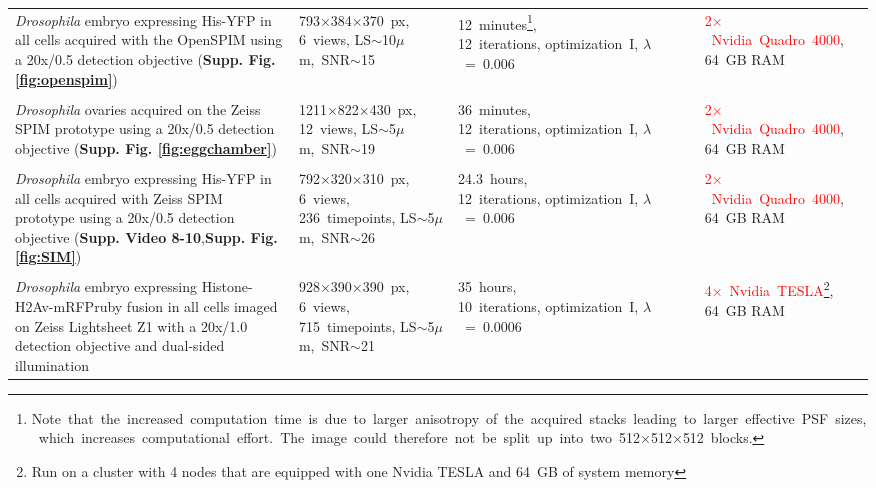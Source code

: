 \documentclass[]{spie}  %
\begin{document}
\begin{savenotes}
\begin{table}[h!]
{\begin{tabular}{p{5.5cm}p{3.0cm}p{3.6cm}p{3.5cm}}
\emph{Drosophila} embryo expressing His-YFP in all cells acquired with the OpenSPIM using a 20x/0.5 detection objective (\textbf{Supp. Fig. \ref{fig:openspim}}) & \mbox{793$\times$384$\times$370~px}, \mbox{6~views}, \mbox{LS$\sim$10$\mu$m, SNR$\sim$15} & \mbox{12 minutes\footnote{Note that the increased computation time is due to larger anisotropy of the acquired stacks leading to larger effective PSF sizes, which increases  computational effort. The image could therefore not be split up into two \mbox{512$\times$512$\times$512} blocks.},~~~~~~~~~~~~~~~~} \mbox{12 iterations}, \mbox{optimization I}, $\lambda$~=~0.006 & \mbox{\textcolor{red}{2$\times$~Nvidia~Quadro~4000}}\setcounter{restorecntr2}{\value{footnote}}\setcounter{footnote}{\value{savecntr2}}\footnotemark \setcounter{footnote}{\value{restorecntr2}}, 64~GB RAM\\
\\
\emph{Drosophila} ovaries acquired on the Zeiss SPIM prototype using a 20x/0.5 detection objective (\textbf{Supp. Fig. \ref{fig:eggchamber}}) & \mbox{1211$\times$822$\times$430~px}, \mbox{12 views}, \mbox{LS$\sim$5$\mu$m, SNR$\sim$19} & \mbox{36 minutes,~~~~~~~~~~~~~~~~} \mbox{12 iterations}, \mbox{optimization I}, $\lambda$~=~0.006  & \mbox{\textcolor{red}{2$\times$~Nvidia~Quadro~4000}}\setcounter{restorecntr2}{\value{footnote}}\setcounter{footnote}{\value{savecntr2}}\footnotemark \setcounter{footnote}{\value{restorecntr2}}, 64~GB RAM \\
\\
\emph{Drosophila} embryo expressing His-YFP in all cells acquired with Zeiss SPIM prototype using a 20x/0.5 detection objective (\textbf{Supp. Video 8-10},\textbf{Supp. Fig. \ref{fig:SIM}}) & \mbox{792$\times$320$\times$310~px}, \mbox{6~views}, \mbox{236 timepoints}, \mbox{LS$\sim$5$\mu$m, SNR$\sim$26} & \mbox{24.3 hours,~~~~~~~~~~~~~~~~} \mbox{12 iterations}, \mbox{optimization I}, $\lambda$~=~0.006 & \mbox{\textcolor{red}{2$\times$~Nvidia~Quadro~4000}}\setcounter{restorecntr2}{\value{footnote}}\setcounter{footnote}{\value{savecntr2}}\footnotemark \setcounter{footnote}{\value{restorecntr2}}, 64~GB RAM\\
\\
\emph{Drosophila} embryo expressing Histone-H2Av-mRFPruby fusion in all cells imaged on Zeiss Lightsheet Z1 with a 20x/1.0 detection objective and dual-sided illumination & \mbox{928$\times$390$\times$390~px}, \mbox{6~views}, \mbox{715~timepoints}, \mbox{LS$\sim$5$\mu$m, SNR$\sim$21} & \mbox{35 hours,~~~~~~~~~~~~~~~~} \mbox{10 iterations}, \mbox{optimization I}, $\lambda$~=~0.0006 & \mbox{\textcolor{red}{4$\times$~Nvidia~TESLA}}\footnote{Run on a cluster with 4 nodes that are equipped with one Nvidia TESLA and 64~GB of system memory}, 64~GB RAM \\

\end{tabular}}
\end{table}
\end{savenotes}
\end{document}

